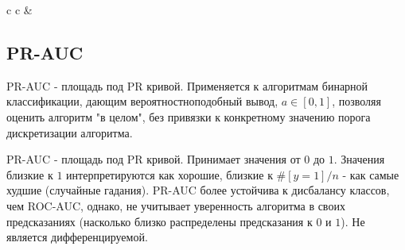 \begin{tabular}{ c c }
    & 
\end{tabular}

\subsection{PR-AUC}

PR-AUC - площадь под PR кривой. Применяется к алгоритмам бинарной классификации, дающим вероятностноподобный вывод, $a\in[0, 1]$, позволяя оценить алгоритм "в целом", без привязки к конкретному значению порога дискретизации алгоритма.

PR-AUC - площадь под PR кривой. Принимает значения от $0$ до $1$. Значения близкие к $1$ интерпретируются как хорошие, близкие к $\#[y=1]/n$ - как самые худшие (случайные гадания). PR-AUC более устойчива к дисбалансу классов, чем ROC-AUC, однако, не учитывает уверенность алгоритма в своих предсказаниях (насколько близко распределены предсказания к $0$ и $1$). Не является дифференцируемой.

